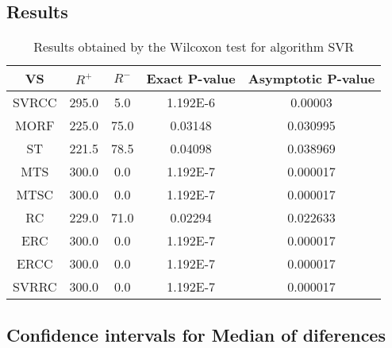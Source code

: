 \documentclass[a4paper,10pt]{article}
\begin{document}
\subsection{Results}

\begin{table}[!htp]
\centering\small
\begin{tabular}{
|c|c|c|c|c|}
\hline
 VS & $R^{+}$ & $R^{-}$ & Exact P-value & Asymptotic P-value \\ \hline 
SVRCC & 295.0 & 5.0 & 1.192E-6 & 0.00003\\ \hline 
MORF & 225.0 & 75.0 & 0.03148 & 0.030995\\ \hline 
ST & 221.5 & 78.5 & 0.04098 & 0.038969\\ \hline 
MTS & 300.0 & 0.0 & 1.192E-7 & 0.000017\\ \hline 
MTSC & 300.0 & 0.0 & 1.192E-7 & 0.000017\\ \hline 
RC & 229.0 & 71.0 & 0.02294 & 0.022633\\ \hline 
ERC & 300.0 & 0.0 & 1.192E-7 & 0.000017\\ \hline 
ERCC & 300.0 & 0.0 & 1.192E-7 & 0.000017\\ \hline 
SVRRC & 300.0 & 0.0 & 1.192E-7 & 0.000017\\ \hline 

\end{tabular}
\caption{Results obtained by the Wilcoxon test for algorithm SVR}
\end{table}

\subsection{Confidence intervals for Median of diferences}
\end{document}
